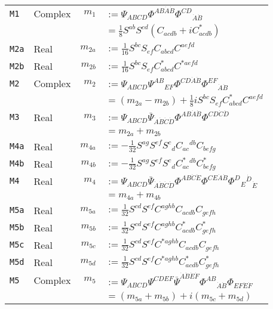 \documentclass{article}
\begin{document}
{{{\begin{longtable}[c]{llrp{}}
\texttt{M1}	& Complex & $m_1$ & $:= \Psi_{ABCD} \Phi^{AB{\dot{A}}{\dot{B}}}
				  \Phi^{CD}{}_{{\dot{A}}{\dot{B}}}$\\
		&	&	& $= \frac{1}{8} S^{ab} S^{cd} ( C_{acdb}
				  + i C^*_{acdb})$ \\
\texttt{M2a}	& Real	& $m_{2a}$ & $:= \frac{1}{16} S^{bc} S_{ef} C_{abcd} 
				  C^{aefd}$ \\
\texttt{M2b}	& Real	& $m_{2b}$ & $:= \frac{1}{16} S^{bc} S_{ef} C^*_{abcd}
				  C^{*aefd}$ \\
\texttt{M2}	& Complex & $m_2$& $:= \Psi_{ABCD} \Psi^{AB}{}_{EF}
				  \Phi^{CD{\dot{A}}{\dot{B}}} 
				  \Phi^{EF}{}_{{\dot{A}}{\dot{B}}}$\\
		&	&	& $= (m_{2a} - m_{2b}) +
				  \frac{1}{8} i S^{bc} S_{ef} C^*_{abcd} 
				  C^{aefd}$\\
\texttt{M3}	& Real	& $m_3$	& $:= \Psi_{ABCD}
				  \bar{\Psi}_{\dot{A}\dot{B}\dot{C}\dot{D}}
				  \Phi^{AB\dot{A}\dot{B}}
				  \Phi^{CD\dot{C}\dot{D}}$\\
		&	&	& $= m_{2a} + m_{2b}$\\
\texttt{M4a}	& Real	& $m_{4a}$ & $:= -\frac{1}{32} S^{ag} S^{ef} S^c{}_d 
				  C_{ac}{}^{db} C_{befg}$ \\
\texttt{M4b}	& Real	& $m_{4b}$ & $:= -\frac{1}{32} S^{ag} S^{ef} S^c{}_d 
				  C^*_{ac}{}^{db} C^*_{befg}$ \\
\texttt{M4}	& Real	& $m_4$ & $:=\Psi_{ABCD}
				  \bar{\Psi}_{\dot{A}\dot{B}\dot{C}\dot{D}}
				  \Phi^{AB\dot{C}\dot{E}}
				  \Phi^{CE\dot{A}\dot{B}}
				  \Phi^D{}_E{}^{\dot{D}}{}_{\dot{E}}$\\
		&	&	& $= m_{4a} + m_{4b}$ \\
\texttt{M5a}	& Real	& $m_{5a}$ & $:= \frac{1}{32} S^{cd} S^{ef} C^{aghb}
				  C_{acdb} C_{gefh}$ \\
\texttt{M5b}	& Real	& $m_{5b}$ & $:= \frac{1}{32} S^{cd} S^{ef} C^{aghb}
				  C^*_{acdb} C^*_{gefh}$ \\
\texttt{M5c}	& Real	& $m_{5c}$ & $:= \frac{1}{32} S^{cd} S^{ef} C^{*aghb} 
				  C_{acdb} C_{gefh}$ \\
\texttt{M5d}	& Real	& $m_{5d}$ & $:= \frac{1}{32} S^{cd} S^{ef} C^{*aghb}
				  C^*_{acdb} C^*_{gefh}$ \\
\texttt{M5}	& Complex & $m_5$ & $:= \Psi_{ABCD}\Psi^{CDEF}
				  \bar{\Psi}^{\dot{A}\dot{B}\dot{E}\dot{F}}
				  \Phi^{AB}{}_{\dot{A}\dot{B}}
				  \Phi_{EF\dot{E}\dot{F}}$\\
		&	&	& $= (m_{5a} + m_{5b}) + i(m_{5c} + m_{5d})$\\

\end{longtable}}}}
\end{document}

